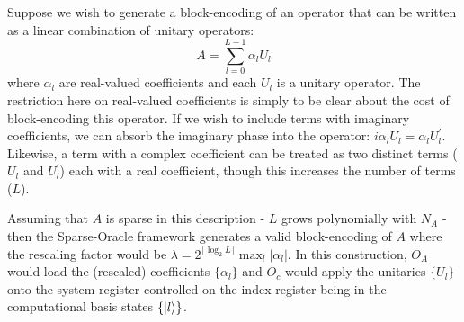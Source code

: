 Suppose we wish to generate a block-encoding of an operator that can be written as a linear combination of unitary operators:
\begin{equation}
    \label{eq:lcu}
    A = \sum_{l=0}^{L-1} \alpha_l U_l
\end{equation}
where $\alpha_l$ are real-valued coefficients and each $U_l$ is a unitary operator.
The restriction here on real-valued coefficients is simply to be clear about the cost of block-encoding this operator. 
If we wish to include terms with imaginary coefficients, we can absorb the imaginary phase into the operator: $i \alpha_l U_l = \alpha_l U_l^\prime$.
Likewise, a term with a complex coefficient can be treated as two distinct terms ($U_l$ and $U_l^\prime$) each with a real coefficient, though this increases the number of terms ($L$).

Assuming that $A$ is sparse in this description - $L$ grows polynomially with $N_A$ - then the Sparse-Oracle framework generates a valid block-encoding of $A$ where the rescaling factor would be $\lambda = 2^{\lceil \log_2 L \rceil} \max_{l} |\alpha_l|$.
In this construction, $O_A$ would load the (rescaled) coefficients $\{\alpha_l\}$ and $O_c$ would apply the unitaries $\{U_l\}$ onto the system register controlled on the index register being in the computational basis states $\{\ket{l}\}$. 

